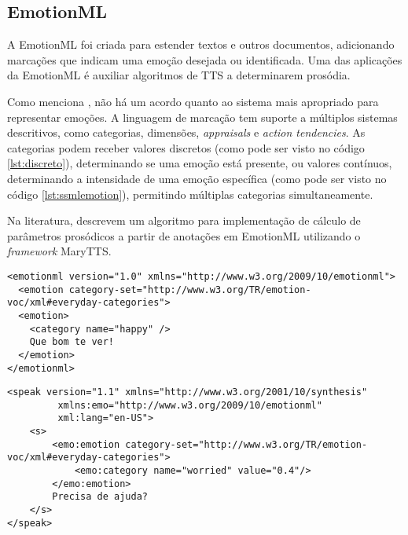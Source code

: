 \subsection{EmotionML}
A EmotionML \cite{emotionml} foi criada para estender textos e outros
documentos, adicionando marcações que indicam uma emoção desejada ou
identificada. Uma das aplicações da EmotionML é auxiliar algoritmos de TTS a
determinarem prosódia.

Como menciona , não há um acordo quanto ao sistema mais
apropriado para representar emoções. A linguagem de marcação tem suporte a
múltiplos sistemas descritivos, como categorias, dimensões, \emph{appraisals} e \emph{action tendencies}. As categorias podem receber valores discretos (como pode ser
visto no código \ref{lst:discreto}), determinando se uma emoção está presente, ou
valores contínuos, determinando a intensidade de uma emoção específica (como
pode ser visto no código \ref{lst:ssmlemotion}), permitindo múltiplas categorias
simultaneamente.

Na literatura,  descrevem um algoritmo para implementação de
cálculo de parâmetros prosódicos a partir de anotações em EmotionML utilizando o
\emph{framework} MaryTTS.

% 


\begin{lstlisting}[caption=Exemplo de texto anotado com EmotionML com parâmetros
  discretos, label=lst:discreto]
<emotionml version="1.0" xmlns="http://www.w3.org/2009/10/emotionml">
  <emotion category-set="http://www.w3.org/TR/emotion-voc/xml#everyday-categories">
  <emotion>
    <category name="happy" />
    Que bom te ver!
  </emotion>
</emotionml>
\end{lstlisting}

\begin{lstlisting}[caption=Exemplo de texto anotado com SSML e EmotionML
  (adaptado de \cite{emotionml}), label=lst:ssmlemotion]
<speak version="1.1" xmlns="http://www.w3.org/2001/10/synthesis"
         xmlns:emo="http://www.w3.org/2009/10/emotionml"
         xml:lang="en-US">
    <s>
        <emo:emotion category-set="http://www.w3.org/TR/emotion-voc/xml#everyday-categories">
            <emo:category name="worried" value="0.4"/>
        </emo:emotion>
        Precisa de ajuda?
    </s>
</speak>
\end{lstlisting}

